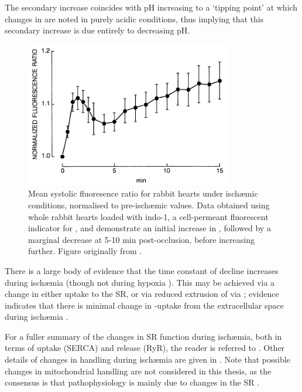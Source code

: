 \documentclass[../thesis-main.tex]{subfiles}
\begin{document}
 The secondary increase coincides with pH increasing to a `tipping point' at which changes in \cai{} are noted in purely acidic conditions, thus implying that this secondary increase is due entirely to decreasing pH.
 \begin{figure}
  \centering
  \includegraphics[width=0.8\textwidth]{ca-ischaemia}
  \caption[Effect of isch\ae{}mia on \cai{}.]{Mean systolic fluoresence ratio for rabbit hearts under isch\ae{}mic conditions, normalised to pre-isch\ae{}mic values. Data obtained using whole rabbit hearts loaded with indo-1, a cell-permeant fluorescent indicator for \ca{}, and demonstrate an initial increase in \cai{}, followed by a marginal decrease at 5-10 min post-occlusion, before increasing further. Figure originally from \citet{Mohabir1991}.}
  \label{fig:ca-ischaemia}
 \end{figure}
 
 There is a large body of evidence that the time constant of \cadia{} decline increases during isch\ae{}mia \citep{Allen1983, Camacho1994, Lee1988} (though not during hypoxia \citep{Silverman1991}). This may be achieved via a change in either \ca{} uptake to the SR, or via reduced extrusion of \ca{} via \inaca{}; evidence indicates that there is minimal change in \ca{}-uptake from the extracellular space during isch\ae{}mia \citep{Bourdillon1982}.
 
 For a fuller summary of the changes in SR function during isch\ae{}mia, both in terms of uptake (SERCA) and release (RyR), the reader is referred to \citet{Mubagwa1995}. Other details of changes in \ca{} handling during isch\ae{}mia are given in \citet{Talukder2009}. Note that possible changes in mitochondrial \ca{} handling are not considered in this thesis, as the consensus is that \ca{} pathophysiology is mainly due to changes in the SR \citep{Fauconnier2013}.
 
\end{document}
